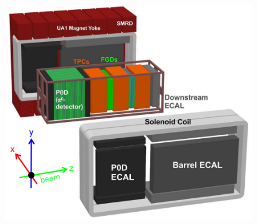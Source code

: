 \begin{figure}[!h]
 \centering
 \includegraphics[width=\linewidth/2]{Chapter2/Figs/Raster/ND280Fig.png} 
 \label{fig:nd280Fig}
\end{figure}

